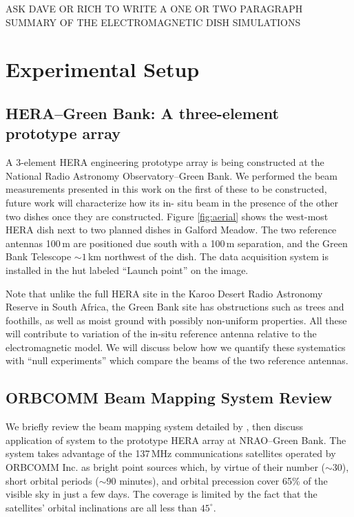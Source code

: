\documentclass[preprint]{aastex}
\begin{document}
ASK DAVE OR RICH TO WRITE A ONE OR TWO PARAGRAPH SUMMARY OF THE ELECTROMAGNETIC DISH SIMULATIONS

\section{Experimental Setup}

\subsection{HERA--Green Bank: A three-element prototype array}


A 3-element HERA engineering prototype array is being constructed at the National Radio 
Astronomy Observatory--Green Bank. We performed the beam measurements presented in 
this work on the first of these to be constructed, future work will characterize how its in-
situ beam in the presence of the other two dishes once they are constructed. Figure 
\ref{fig:aerial} shows the west-most HERA dish next to two planned dishes in Galford 
Meadow. The two reference antennas 100\,m are positioned due south with a 100\,m 
separation, and the Green Bank Telescope $\sim1$\,km northwest of the dish. The data 
acquisition system is installed in the hut labeled ``Launch point'' on the image. 

Note that unlike the full HERA site in the Karoo Desert Radio Astronomy Reserve in 
South Africa, the Green Bank site has obstructions such as trees and foothills, as well as 
moist ground with possibly non-uniform properties. All these will contribute to variation 
of the in-situ reference antenna relative to the electromagnetic model. We will discuss 
below how we quantify these systematics with ``null experiments'' which compare the 
beams of the two reference antennas.

\subsection{ORBCOMM Beam Mapping System Review}

We briefly review the beam mapping system detailed by \citet{neben15}, then discuss 
application of system to the prototype HERA array at NRAO--Green Bank. The system 
takes advantage of the 137\,MHz communications satellites operated by ORBCOMM Inc. 
as bright point sources which, by virtue of their number ($\sim30$), short orbital periods 
($\sim90$ minutes), and orbital precession cover 65\% of the visible sky in just a few 
days. The coverage is limited by the fact that the satellites' orbital inclinations are all less 
than $45^\circ$. 
\end{document}
